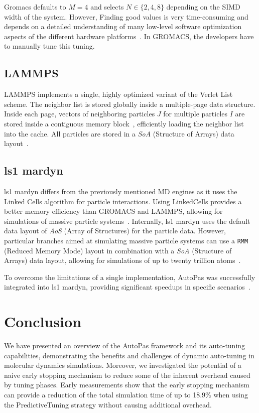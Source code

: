 \documentclass[conference]{IEEEtran}
\begin{document}
Gromacs defaults to $M=4$ and selects $N \in \{2, 4, 8\}$ depending on the SIMD width of the system. However, Finding good values is very time-consuming and depends on a detailed understanding of many low-level software optimization aspects of the different hardware platforms~\cite{PALL20132641}. In GROMACS, the developers have to manually tune this tuning.

\subsection{LAMMPS}

LAMMPS implements a single, highly optimized variant of the Verlet List scheme. The neighbor list is stored globally inside a multiple-page data structure. Inside each page, vectors of neighboring particles $J$ for multiple particles $I$ are stored inside a contiguous memory block~\cite{THOMPSON2022108171}, efficiently loading the neighbor list into the cache.
All particles are stored in a \textit{SoA} (Structure of Arrays) data layout~\cite{THOMPSON2022108171}.

\subsection{ls1 mardyn}

ls1 mardyn differs from the previously mentioned MD engines as it uses the Linked Cells algorithm for particle interactions. Using LinkedCells provides a better memory efficiency than GROMACS and LAMMPS, allowing for simulations of massive particle systems~\cite{tchipev2019twe}. Internally, ls1 mardyn uses the default data layout of \textit{AoS} (Array of Structures) for the particle data. However, particular branches aimed at simulating massive particle systems can use a \texttt{RMM} (Reduced Memory Mode) layout in combination with a \textit{SoA} (Structure of Arrays) data layout, allowing for simulations of up to twenty trillion atoms~\cite{tchipev2019twe}.

To overcome the limitations of a single implementation, AutoPas was successfully integrated into ls1 mardyn, providing significant speedups in specific scenarios~\cite{SECKLER2021101296}.


\section{Conclusion}


We have presented an overview of the AutoPas framework and its auto-tuning capabilities, demonstrating the benefits and challenges of dynamic auto-tuning in molecular dynamics simulations. Moreover, we investigated the potential of a naive early stopping mechanism to reduce some of the inherent overhead caused by tuning phases. Early measurements show that the early stopping mechanism can provide a reduction of the total simulation time of up to 18.9\% when using the PredictiveTuning strategy without causing additional overhead.
\end{document}
